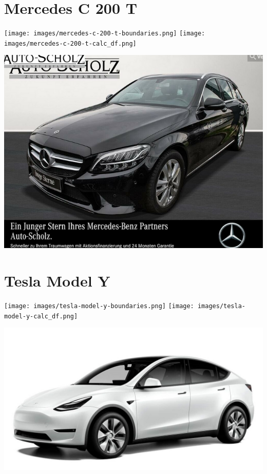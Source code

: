 \documentclass[landscape, DIV=99]{scrartcl}
\begin{document}
\pagebreak


\twocolumn

\section*{Mercedes C 200 T}
\begin{center}
\texttt{[image: images/mercedes-c-200-t-boundaries.png]}
\null
\vspace{0.5cm}
\texttt{[image: images/mercedes-c-200-t-calc\_df.png]}
\end{center}

\pagebreak
\null
\vspace{2cm}
\begin{center}
\includegraphics[width=0.9\columnwidth]{cars/mercedes-c-200-t.png}
\end{center}

\pagebreak


\twocolumn

\section*{Tesla Model Y}
\begin{center}
\texttt{[image: images/tesla-model-y-boundaries.png]}
\null
\vspace{0.5cm}
\texttt{[image: images/tesla-model-y-calc\_df.png]}
\end{center}

\pagebreak
\null
\vspace{2cm}
\begin{center}
\includegraphics[width=0.9\columnwidth]{cars/tesla-model-y.jpg}
\end{center}
\end{document}
